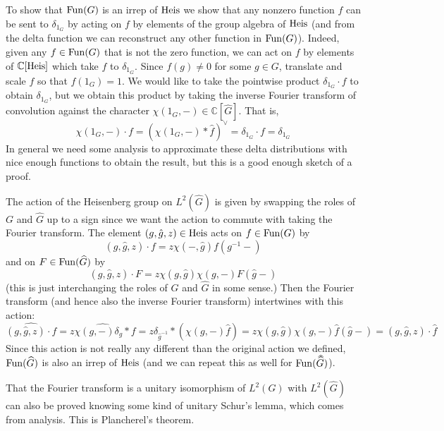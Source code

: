 \documentclass[../../rtnotes.tex]{subfiles}
\begin{document}
To show that $\operatorname{Fun}(G)$ is an irrep of $\operatorname{Heis}$ we show that any nonzero function $f$ can be sent to $\delta_{1_G}$ by acting on $f$ by elements of the group algebra of $\operatorname{Heis}$ (and from the delta function we can reconstruct any other function in $\operatorname{Fun}(G)$). Indeed, given any $f\in \operatorname{Fun}(G)$ that is not the zero function, we can act on $f$ by elements of $\mathbb C[\operatorname{Heis}]$ which take $f$ to $\delta_{1_G}$. Since $f(g) \neq 0$ for some $g\in G$, translate and scale $f$ so that $f(1_G) = 1$. We would like to take the pointwise product $\delta_{1_G}\cdot f$ to obtain $\delta_{1_G}$, but we obtain this product by taking the inverse Fourier transform of convolution against the character $\chi(1_G,-)\in\mathbb C[\widehat G]$. That is,
\[\chi(1_G,-)\cdot f = (\chi(1_G,-)\ast\hat f)^\vee = \delta_{1_G}\cdot f = \delta_{1_G}\]
In general we need some analysis to approximate these delta distributions with nice enough functions to obtain the result, but this is a good enough sketch of a proof.

The action of the Heisenberg group on $L^2(\widehat G)$ is given by swapping the roles of $G$ and $\widehat G$ up to a sign since we want the action to commute with taking the Fourier transform. The element $(g,\hat g, z)\in \operatorname{Heis}$ acts on $f\in \operatorname{Fun}(G)$ by
\[(g,\hat g, z)\cdot f = z\chi(-,\hat g)f(g^{-1}-)\]
and on $F\in \operatorname{Fun}(\widehat G)$ by 
\[(g,\hat g, z)\cdot F = z\chi(g,\hat g)\chi(g,-)F(\hat g-)\]
(this is just interchanging the roles of $G$ and $\widehat G$ in some sense.) Then the Fourier transform (and hence also the inverse Fourier transform) intertwines with this action:
\[\widehat{(g,\hat g,z)\cdot f} = \widehat{z\chi(g,-)\delta_g\ast f} = z\delta_{\hat g^{-1}}\ast(\chi(g,-)\hat f) = z\chi(g,\hat g)\chi(g,-)\hat f(\hat g-) = (g,\hat g, z)\cdot \hat f\]
Since this action is not really any different than the original action we defined, $\operatorname{Fun}(\widehat G)$ is also an irrep of $\operatorname{Heis}$ (and we can repeat this as well for $\Fun(\dwidehat G)$).

That the Fourier transform is a unitary isomorphism of $L^2(G)$ with $L^2(\widehat G)$ can also be proved knowing some kind of unitary Schur's lemma, which comes from analysis. 
This is Plancherel's theorem.
\end{document}

